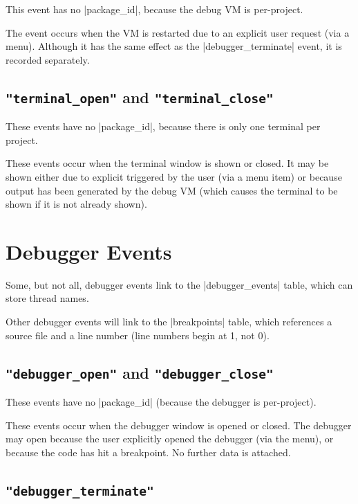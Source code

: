 \documentclass{report}
\newcommand{\myref}[1]{\autoref{#1} on page \pageref*{#1}}
\newcommand{\intern}{This table may be interned, see \myref{def:intern}.}
\begin{document}
This event has no |package_id|, because the debug VM is per-project.

The event occurs when the VM is restarted due to an explicit user request (via
a menu).  Although it has the same effect as the |debugger_terminate| event,
it is recorded separately.

\subsection{\lstinline!"terminal_open"! and \lstinline!"terminal_close"!}

These events have no |package_id|, because there is only one terminal
per project.

These events occur when the terminal window is shown or closed.  It
may be shown either due to explicit triggered by the user (via a menu
item) or because output has been generated by the debug VM (which
causes the terminal to be shown if it is not already shown).

\section{Debugger Events}

Some, but not all, debugger events link to the |debugger_events|
table, which can store thread names.


Other debugger events will link to the |breakpoints| table, which references a
source file and a line number (line numbers begin at 1, not 0).


\subsection{\lstinline!"debugger_open"! and \lstinline!"debugger_close"!}

These events have no |package_id| (because the debugger is per-project).

These events occur when the debugger window is opened or closed.  The debugger
may open because the user explicitly opened the debugger (via the menu), or
because the code has hit a breakpoint.  No further data is attached.

\subsection{\lstinline!"debugger_terminate"!}
\end{document}
